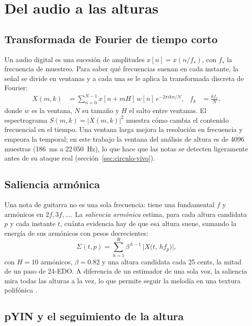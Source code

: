\section{Del audio a las alturas}\label{sec:senal}

\subsection{Transformada de Fourier de tiempo corto}

Un audio digital es una sucesión de amplitudes $x[n] = x(n/f_s)$, con $f_s$ la frecuencia de muestreo. Para saber qué
frecuencias suenan en cada instante, la señal se divide en ventanas y a cada una se le aplica la transformada discreta
de Fourier:
\begin{align*}
  X(m, k) &= \sum_{n=0}^{N-1} x[n + mH]\, w[n]\, e^{-2\pi i k n / N}, &
  f_k &= \frac{k f_s}{N},
\end{align*}
donde $w$ es la ventana, $N$ su tamaño y $H$ el salto entre ventanas. El espectrograma $S(m,k) = |X(m,k)|^2$ muestra
cómo cambia el contenido frecuencial en el tiempo. Una ventana larga mejora la resolución en frecuencia y empeora la
temporal; en este trabajo la ventana del análisis de altura es de 4096 muestras (186~ms a 22\,050~Hz), lo que hace que
las notas se detecten ligeramente antes de su ataque real (sección~\ref{sec:circulo-vivo}).

\subsection{Saliencia armónica}

Una nota de guitarra no es una sola frecuencia: tiene una fundamental $f$ y armónicos en $2f, 3f, \dots$. La
\emph{saliencia armónica} estima, para cada altura candidata $p$ y cada instante $t$, cuánta evidencia hay de que esa
altura suene, sumando la energía de sus armónicos con pesos decrecientes:
\[
  \Sigma(t, p) = \sum_{h=1}^{H} \beta^{\,h-1}\, \bigl| X\bigl(t,\, h f_p\bigr) \bigr|,
\]
con $H = 10$ armónicos, $\beta = 0.82$ y una altura candidata cada 25 cents, la mitad de un paso de 24-EDO. A diferencia
de un estimador de una sola voz, la saliencia mira todas las alturas a la vez, lo que permite seguir la melodía en una
textura polifónica \citep{salamon2012}.

\subsection{pYIN y el seguimiento de la altura}

